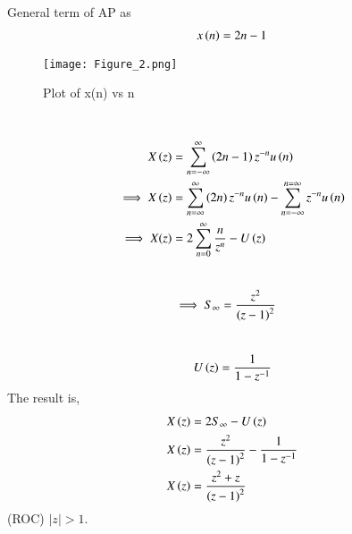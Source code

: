 \documentclass[journal,12pt,twocolumn]{IEEEtran}
\theoremstyle{remark}
\begin{document}
General term of AP as 
\begin{align}
    x\left(n\right)=2n-1
\end{align}
\begin{figure}[!h]
    \centering
    \texttt{[image: Figure\_2.png]}
    \caption{Plot of x(n) vs n}
    \label{fig:1}
\end{figure}
\\
\begin{align}
    X\left(z\right)&=\sum_{n=-\infty}^{\infty}\left(2n-1\right)z^{-n}u\left(n\right) \\ \implies X\left(z\right)&=\sum_{n=\infty}^{\infty}\left(2n\right)z^{-n}u\left(n\right) -\sum_{n=-\infty}^{n=\infty}z^{-n}u\left(n\right)\\
   \implies X(z)&=2\sum_{n=0}^{\infty}\dfrac{n}{z^{n}}-U\left(z\right)
\end{align}
\\
\begin{align}
   \implies S_\infty&=\dfrac{z^2}{\left(z-1\right)^{2}}
\end{align}
\\
\begin{align}
   U\left(z\right)=\dfrac{1}{1-z^{-1}}
\end{align}
The result is,
\begin{align}
    X\left(z\right)&=2S_\infty-U\left(z\right)\\
    X\left(z\right)&=\dfrac{z^2}{\left(z-1\right)^{2}}-\dfrac{1}{1-z^{-1}}\\
    X\left(z\right)&=\dfrac{z^2+z}{\left(z-1\right)^{2}}
\end{align}
(ROC) \(|z| > 1\).\\
\end{document}
